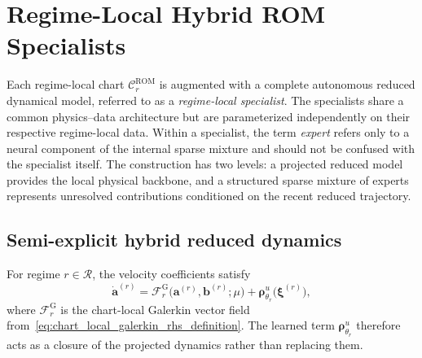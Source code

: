 \section{Regime-Local Hybrid ROM Specialists}
\label{sec:regime_local_specialists}
\label{sec:hprs_specialists}

Each regime-local chart $\mathcal{C}^{\mathrm{ROM}}_r$ is augmented with a
complete autonomous reduced dynamical model, referred to as a
\emph{regime-local specialist}.  The specialists share a common
physics--data architecture but are parameterized independently on their
respective regime-local data.  Within a specialist, the term \emph{expert}
refers only to a neural component of the internal sparse mixture and should
not be confused with the specialist itself.  The construction has two
levels: a projected reduced model provides the local physical backbone, and
a structured sparse mixture of experts represents unresolved contributions
conditioned on the recent reduced trajectory.

\subsection{Semi-explicit hybrid reduced dynamics}
\label{subsec:semi_explicit_hybrid_dynamics}

For regime $r\in\mathcal{R}$, the velocity coefficients satisfy
\begin{equation}
  \dot{\boldsymbol{a}}^{(r)}
  =
  \mathscr{F}^{\mathrm{G}}_r
  \bigl(\boldsymbol{a}^{(r)},\boldsymbol{b}^{(r)};\mu\bigr)
  +
  \boldsymbol{\rho}^{u}_{\theta_r}
  \bigl(\boldsymbol{\xi}^{(r)}\bigr),
  \label{eq:hybrid_velocity_rhs}
\end{equation}
where $\mathscr{F}^{\mathrm{G}}_r$ is the chart-local Galerkin vector field
from~\eqref{eq:chart_local_galerkin_rhs_definition}.  The learned term
$\boldsymbol{\rho}^{u}_{\theta_r}$ therefore acts as a closure of the
projected dynamics rather than replacing them.

